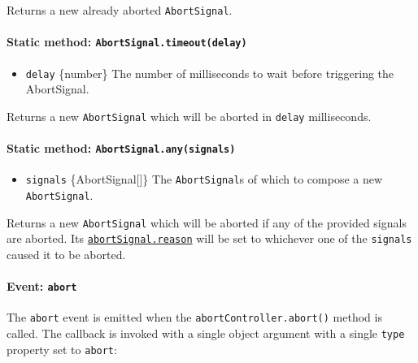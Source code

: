 Returns a new already aborted \texttt{AbortSignal}.

\paragraph{\texorpdfstring{Static method:
\texttt{AbortSignal.timeout(delay)}}{Static method: AbortSignal.timeout(delay)}}\label{static-method-abortsignal.timeoutdelay}

\begin{itemize}
\tightlist
\item
  \texttt{delay} \{number\} The number of milliseconds to wait before
  triggering the AbortSignal.
\end{itemize}

Returns a new \texttt{AbortSignal} which will be aborted in
\texttt{delay} milliseconds.

\paragraph{\texorpdfstring{Static method:
\texttt{AbortSignal.any(signals)}}{Static method: AbortSignal.any(signals)}}\label{static-method-abortsignal.anysignals}

\begin{itemize}
\tightlist
\item
  \texttt{signals} \{AbortSignal{[}{]}\} The \texttt{AbortSignal}s of
  which to compose a new \texttt{AbortSignal}.
\end{itemize}

Returns a new \texttt{AbortSignal} which will be aborted if any of the
provided signals are aborted. Its
\hyperref[abortsignalreason]{\texttt{abortSignal.reason}} will be set to
whichever one of the \texttt{signals} caused it to be aborted.

\paragraph{\texorpdfstring{Event:
\texttt{\textquotesingle{}abort\textquotesingle{}}}{Event: \textquotesingle abort\textquotesingle{}}}\label{event-abort}

The \texttt{\textquotesingle{}abort\textquotesingle{}} event is emitted
when the \texttt{abortController.abort()} method is called. The callback
is invoked with a single object argument with a single \texttt{type}
property set to \texttt{\textquotesingle{}abort\textquotesingle{}}:

